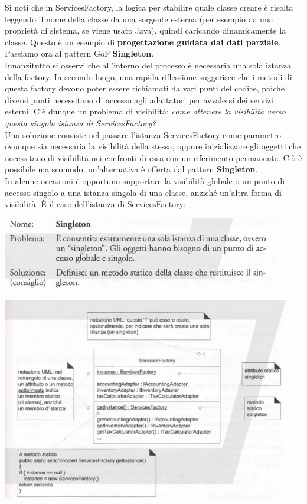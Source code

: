 \documentclass[a4paper,12pt, oneside]{book}
\begin{document}
Si noti che in ServicesFactory, la logica per stabilire quale classe creare è risolta leggendo
il nome della classe da una sorgente esterna (per esempio da una proprietà di sistema,
se viene usato Java), quindi caricando dinamicamente la classe. Questo è un esempio di
\textbf{progettazione guidata dai dati parziale}.
Passiamo ora al pattern GoF \textbf{Singleton}.\\
Innanzitutto si osservi che all'interno del processo è necessaria una sola istanza della
factory. In secondo luogo, una rapida riflessione suggerisce che i metodi di questa factory
devono poter essere richiamati da vari punti del codice, poiché diversi punti necessitano
di accesso agli adattatori per avvalersi dei servizi esterni. C'è dunque un problema di visibilità: \textit{come ottenere la visibilità verso questa singola istanza di ServicesFactory?}\\
Una soluzione consiste nel passare l'istanza ServicesFactory come parametro ovunque sia
necessaria la visibilità della stessa, oppure inizializzare gli oggetti che necessitano di visibilità nei confronti di essa con un riferimento permanente. Ciò è possibile ma scomodo;
un'alternativa è offerta dal pattern\textbf{ Singleton}.\\
In alcune occasioni è opportuno supportare la visibilità globale o un punto di accesso
singolo a una istanza singola di una classe, anziché un'altra forma di visibilità. È il caso
dell'istanza di ServicesFactory:
\begin{center}
\includegraphics[scale = 0.7]{img/gof8.png}
\end{center}
\begin{center}
\includegraphics[scale = 0.7]{img/gof9.png}
\end{center}
\end{document}
